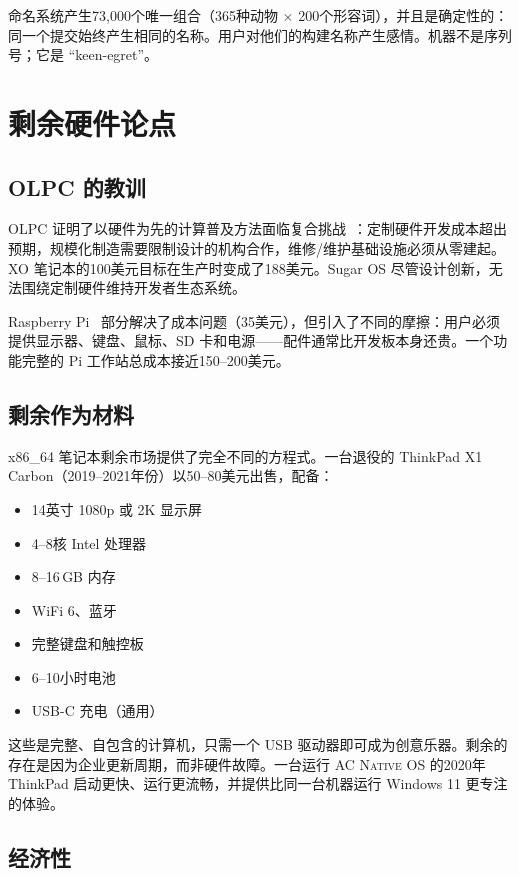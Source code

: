 \documentclass[10pt,letterpaper,twocolumn]{article}
\newcommand{\acos}{\textsc{AC Native OS}}
\begin{document}
命名系统产生73,000个唯一组合（365种动物 $\times$ 200个形容词），并且是确定性的：同一个提交始终产生相同的名称。用户对他们的构建名称产生感情。机器不是序列号；它是 ``keen-egret''。


\section{剩余硬件论点}
\label{sec:surplus}

\subsection{OLPC 的教训}

OLPC 证明了以硬件为先的计算普及方法面临复合挑战~\citep{kraemer2009olpc}：定制硬件开发成本超出预期，规模化制造需要限制设计的机构合作，维修/维护基础设施必须从零建起。XO 笔记本的100美元目标在生产时变成了188美元。Sugar OS 尽管设计创新，无法围绕定制硬件维持开发者生态系统。

Raspberry Pi~\citep{raspberry2012} 部分解决了成本问题（35美元），但引入了不同的摩擦：用户必须提供显示器、键盘、鼠标、SD 卡和电源——配件通常比开发板本身还贵。一个功能完整的 Pi 工作站总成本接近150--200美元。

\subsection{剩余作为材料}

x86\_64 笔记本剩余市场提供了完全不同的方程式。一台退役的 ThinkPad X1 Carbon（2019--2021年份）以50--80美元出售，配备：

\begin{itemize}
  \item 14英寸 1080p 或 2K 显示屏
  \item 4--8核 Intel 处理器
  \item 8--16\,GB 内存
  \item WiFi 6、蓝牙
  \item 完整键盘和触控板
  \item 6--10小时电池
  \item USB-C 充电（通用）
\end{itemize}

这些是完整、自包含的计算机，只需一个 USB 驱动器即可成为创意乐器。剩余的存在是因为企业更新周期，而非硬件故障。一台运行 \acos{} 的2020年 ThinkPad 启动更快、运行更流畅，并提供比同一台机器运行 Windows 11 更专注的体验。

\subsection{经济性}
\end{document}
